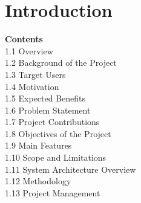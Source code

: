 \chapter{Introduction}

\vspace{-0.5cm}
\begin{center}
\begin{minipage}{0.85\textwidth}
\small
\textbf{Contents}\\[0.3cm]
\hspace*{1cm} 1.1 \quad Overview \dotfill \pageref{sec:overview}\\
\hspace*{1cm} 1.2 \quad Background of the Project \dotfill \pageref{sec:background}\\
\hspace*{1cm} 1.3 \quad Target Users \dotfill \pageref{sec:targetusers}\\
\hspace*{1cm} 1.4 \quad Motivation \dotfill \pageref{sec:motivation}\\
\hspace*{1cm} 1.5 \quad Expected Benefits \dotfill \pageref{sec:benefits}\\
\hspace*{1cm} 1.6 \quad Problem Statement \dotfill \pageref{sec:problem}\\
\hspace*{1cm} 1.7 \quad Project Contributions \dotfill \pageref{sec:contributions}\\
\hspace*{1cm} 1.8 \quad Objectives of the Project \dotfill \pageref{sec:objectives}\\
\hspace*{1cm} 1.9 \quad Main Features \dotfill \pageref{sec:features}\\
\hspace*{1cm} 1.10 \quad Scope and Limitations \dotfill \pageref{sec:scope}\\
\hspace*{1cm} 1.11 \quad System Architecture Overview \dotfill \pageref{sec:sysarch}\\
\hspace*{1cm} 1.12 \quad Methodology \dotfill \pageref{sec:methodology}\\
\hspace*{1cm} 1.13 \quad Project Management \dotfill \pageref{sec:management}\\
\end{minipage}
\end{center}
\vspace{0.5cm}
\newpage

